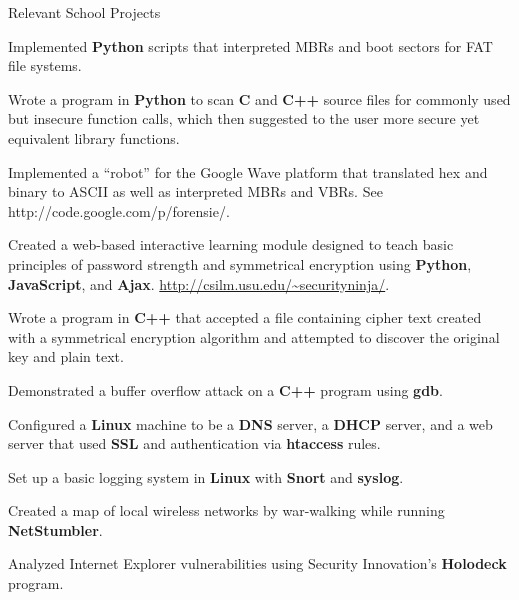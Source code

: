 
\begin{rBulletSection}{Relevant School Projects}

    \item Implemented \textbf{Python} scripts that interpreted MBRs and boot sectors for FAT file systems.

    \item Wrote a program in \textbf{Python} to scan \textbf{C} and \textbf{C++} source files for commonly used but insecure function calls, which then suggested to the user more secure yet equivalent library functions.

    \item Implemented a ``robot'' for the Google Wave platform that translated hex and binary to ASCII as well as interpreted MBRs and VBRs. See http://code.google.com/p/forensie/.

    \item Created a web-based interactive learning module designed to teach basic principles of password strength and symmetrical encryption using \textbf{Python}, \textbf{JavaScript}, and \textbf{Ajax}. \href{http://csilm.usu.edu/~securityninja/}{http://csilm.usu.edu/\textasciitilde securityninja/}.

    \item Wrote a program in \textbf{C++} that accepted a file containing cipher text created with a symmetrical encryption algorithm and attempted to discover the original key and plain text.

    \item Demonstrated a buffer overflow attack on a \textbf{C++} program using \textbf{gdb}.

    \item Configured a \textbf{Linux} machine to be a \textbf{DNS} server, a \textbf{DHCP} server, and a web server that used \textbf{SSL} and authentication via \textbf{htaccess} rules.

    \item Set up a basic logging system in \textbf{Linux} with \textbf{Snort} and \textbf{syslog}.

    \item Created a map of local wireless networks by war-walking while running \textbf{NetStumbler}.

    \item Analyzed Internet Explorer vulnerabilities using Security Innovation's \textbf{Holodeck} program.

\end{rBulletSection}
